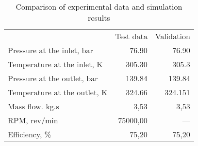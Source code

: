 \begin{table}
\label{tab:Comparison1}
\caption{Comparison of experimental data and simulation results}
\begin{center}
\begin{tabulary}{0.9\textwidth}{LRR}

	&	Test data \cite{Rinaldi_2013}	&	Validation	\\
Pressure at the inlet, bar	&	76.90	&	76.90	\\
Temperature at the inlet, K	&	305.30	&	305.3	\\
Pressure at the outlet, bar	&	139.84	&	139.84	\\
Temperature at the outlet, K	&	324.66	&	324.151	\\
Mass flow. kg.s	&	3,53	&	3,53	\\
RPM, rev/min	&	75000,00	&	—	\\
Efficiency, \%	&	75,20	&	75,20	\\

\end{tabulary}
\end{center}
\end{table}